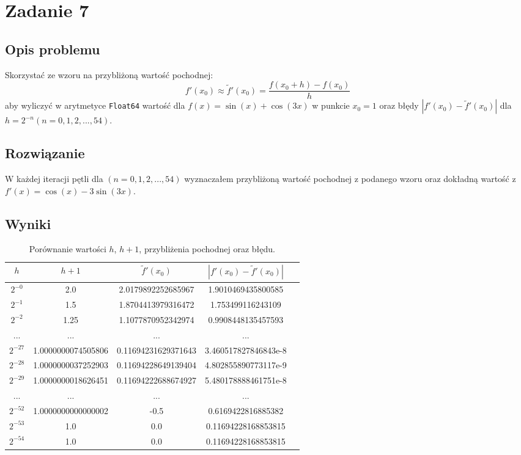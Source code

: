 \documentclass{article}
\begin{document}
\section{Zadanie 7}
\subsection{Opis problemu}
Skorzystać ze wzoru na przybliżoną wartość pochodnej:
$$ f'(x_0) \approx \tilde{f}'(x_0) = \frac{f(x_0 + h) - f(x_0)}{h} $$
aby wyliczyć w arytmetyce \texttt{Float64} wartość dla $f(x) = \sin(x) + \cos(3x)$ w punkcie $x_0 = 1$ oraz błędy
$|f'(x_0) - \tilde{f}'(x_0)|$ dla $h = 2^{-n} (n = 0, 1, 2, ..., 54)$.

\subsection{Rozwiązanie}
W każdej iteracji pętli dla $(n = 0, 1, 2, ..., 54)$ wyznaczałem przybliżoną wartość pochodnej z podanego wzoru oraz
dokładną wartość z $f'(x) = \cos(x) - 3\sin(3x)$.

\subsection{Wyniki}
\begin{table}[H]
\begin{adjustbox}{center}
\begin{tabular}{|c|c|c|c|c|}
    \hline
    $h$ & $h + 1$ & $\tilde{f}'(x_0)$ & $|f'(x_0) - \tilde{f}'(x_0)|$\\
    \hline
    $2^{-0}$ & 2.0 & 2.0179892252685967 & 1.9010469435800585\\
    \hline
    $2^{-1}$ & 1.5 & 1.8704413979316472 & 1.753499116243109\\
    \hline
    $2^{-2}$ & 1.25 & 1.1077870952342974 & 0.9908448135457593\\
    \hline
    ... & ... & ... & ...\\
    \hline
    $2^{-27}$ & 1.0000000074505806 & 0.11694231629371643 & 3.460517827846843e-8\\
    \hline
    $2^{-28}$ & 1.0000000037252903 & 0.11694228649139404 & 4.802855890773117e-9\\
    \hline
    $2^{-29}$ & 1.0000000018626451 & 0.11694222688674927 & 5.480178888461751e-8\\
    \hline
    ... & ... & ... & ...\\
    \hline
    $2^{-52}$ & 1.0000000000000002 & -0.5 & 0.6169422816885382\\
    \hline
    $2^{-53}$ & 1.0 & 0.0 & 0.11694228168853815\\
    \hline
    $2^{-54}$ & 1.0 & 0.0 & 0.11694228168853815\\
    \hline
\end{tabular}
\end{adjustbox}
\caption{Porównanie wartości $h$, $h + 1$, przybliżenia pochodnej oraz błędu.}
\end{table}
\end{document}
